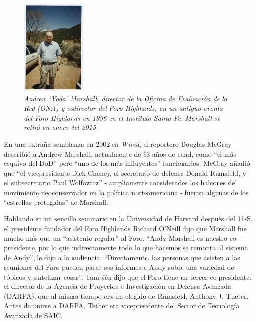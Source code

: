 \documentclass[10pt,a5paper,twoside,spanish,]{book}
\begin{document}
\begin{figure}[htbp]
\centering
\includegraphics{1.3.png}
\caption{\emph{Andrew `Yoda' Marshall, director de la Oficina de
Evaluación de la Red (ONA) y codirector del Foro Highlands, en un
antiguo evento del Foro Highlands en 1996 en el Instituto Santa Fe.
Marshall se retiró en enero del 2015}}
\end{figure}

En una extraña semblanza en 2002 en \emph{Wired}, el reportero Douglas
McGray describió a Andrew Marshall, actualmente de 93 años de edad, como
``el más esquivo del DoD'' pero ``uno de los más influyentes''
funcionarios. McGray añadió que ``el vicepresidente Dick Cheney, el
secretario de defensa Donald Rumsfeld, y el subsecretario Paul
Wolfowitz'' - ampliamente considerados los halcones del movimiento
neoconservador en la política norteamericana - fueron algunas de los
``estrellas protegidas'' de Marshall.

Hablando en un sencillo seminario en la Universidad de Harvard después
del 11-S, el presidente fundador del Foro Highlands Richard O'Neill dijo
que Marshall fue mucho más que un ``asistente regular'' al Foro. ``Andy
Marshall es nuestro co-presidente, por lo que indirectamente todo lo que
hacemos se remonta al sistema de Andy'', le dijo a la audiencia.
``Directamente, las personas que asisten a las reuniones del Foro pueden
pasar sus informes a Andy sobre una variedad de tópicos y sintetizar
cosas''. También dijo que el Foro tiene un tercer co-presidente: el
director de la Agencia de Proyectos e Investigación en Defensa Avanzada
(DARPA), que al mismo tiempo era un elegido de Rumsfeld, Anthony J.
Theter. Antes de unirse a DARPA, Tether era vicepresidente del Sector de
Tecnología Avanzada de SAIC.
\end{document}
